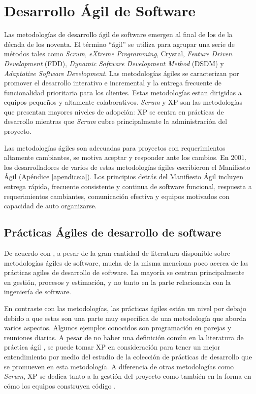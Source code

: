 \documentclass[journal]{IEEEtran}
\begin{document}

\section{Desarrollo Ágil de Software}
Las metodologías de desarrollo ágil de software emergen al final de los de la década de los noventa. El término ``ágil'' se utiliza para agrupar una serie de métodos tales como \emph{Scrum}, \emph{eXtreme Programming}, Crystal, \emph{Feature Driven Development} (FDD), \emph{Dynamic Software Development Method} (DSDM) y \emph{Adaptative Software Development}\cite{rashina-et-al}. Las metodologías ágiles se caracterizan por promover el desarrollo interativo e incremental y la entrega frecuente de funcionalidad prioritaria para los clientes. Estas metodologías estan dirigidas a equipos pequeños y altamente colaborativos. \emph{Scrum} y XP son las metodologías que presentan mayores niveles de adopción\cite{version-one}: XP se centra en prácticas de desarrollo mientras que \emph{Scrum} cubre principalmente la administración del proyecto.

Las metodologías ágiles son adecuadas para proyectos con requerimientos altamente cambiantes, se motiva aceptar y responder ante los cambios. En 2001, los desarrolladores de varios de estas metodologías ágiles escribieron el Manifiesto Ágil \cite{agile-manifesto} (Apéndice \ref{apendice:a}). Los principios detrás del Manifiesto Ágil incluyen entrega rápida, frecuente consistente y continua de software funcional, respuesta a requerimientos cambiantes, comunicación efectiva y equipos motivados con capacidad de auto organizarse.

\subsection{Prácticas Ágiles de desarrollo de software}
De acuerdo con \cite{ford}, a pesar de la gran cantidad de literatura disponible sobre metodologías ágiles de software, mucha de la misma menciona poco acerca de las prácticas agiles de desarrollo de software. La mayoría se centran principalmente en gestión, procesos y estimación, y no tanto en la parte relacionada con la ingeniería de software.

En contraste con las metodologías, las prácticas ágiles están un nivel por debajo debido a que estas son una parte muy específica de una metodología que aborda varios aspectos. Algunos ejemplos conocidos son programación en parejas y reuniones diarias. A pesar de no haber una definición común en la literatura de práctica ágil \cite{diebold-dahlem}, se puede tomar XP en consideración para tener un mejor entendimiento por medio del estudio de la colección de prácticas de desarrollo que se promueven en esta metodología. A diferencia de otras metodologías como \emph{Scrum}, XP se dedica tanto a la gestión del proyecto como también en la forma en cómo los equipos construyen código \cite{shore-warden}.
\end{document}
